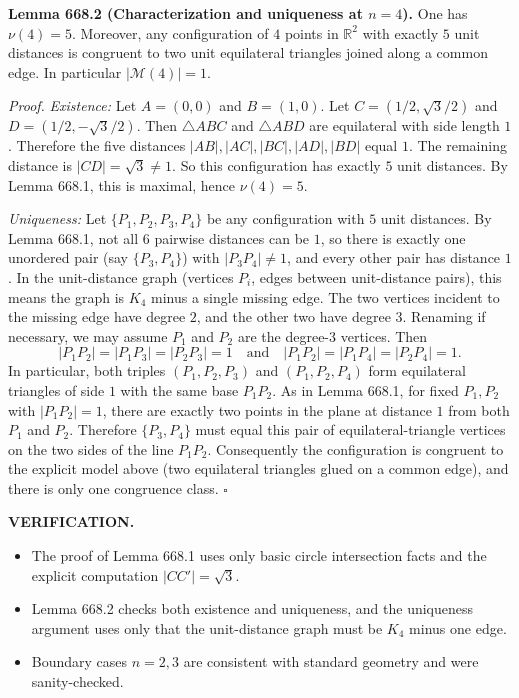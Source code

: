 \medskip
\noindent\textbf{Lemma 668.2 (Characterization and uniqueness at $n=4$).}
One has $\nu(4)=5$.
Moreover, any configuration of $4$ points in $\mathbb{R}^2$ with exactly $5$ unit distances is congruent to two unit equilateral triangles joined along a common edge.
In particular $|\mathcal{M}(4)|=1$.

\noindent\emph{Proof.}
\emph{Existence:} Let $A=(0,0)$ and $B=(1,0)$.
Let $C=(1/2,\sqrt3/2)$ and $D=(1/2,-\sqrt3/2)$.
Then $\triangle ABC$ and $\triangle ABD$ are equilateral with side length $1$.
Therefore the five distances $|AB|,|AC|,|BC|,|AD|,|BD|$ equal $1$.
The remaining distance is $|CD|=\sqrt3\ne 1$.
So this configuration has exactly $5$ unit distances.
By Lemma 668.1, this is maximal, hence $\nu(4)=5$.

\emph{Uniqueness:} Let $\{P_1,P_2,P_3,P_4\}$ be any configuration with $5$ unit distances.
By Lemma 668.1, not all $6$ pairwise distances can be $1$, so there is exactly one unordered pair (say $\{P_3,P_4\}$) with $|P_3P_4|\ne 1$, and every other pair has distance $1$.
In the unit-distance graph (vertices $P_i$, edges between unit-distance pairs), this means the graph is $K_4$ minus a single missing edge.
The two vertices incident to the missing edge have degree $2$, and the other two have degree $3$.
Renaming if necessary, we may assume $P_1$ and $P_2$ are the degree-$3$ vertices.
Then
\[
|P_1P_2|=|P_1P_3|=|P_2P_3|=1
\quad\text{and}\quad
|P_1P_2|=|P_1P_4|=|P_2P_4|=1.
\]
In particular, both triples $(P_1,P_2,P_3)$ and $(P_1,P_2,P_4)$ form equilateral triangles of side $1$ with the same base $P_1P_2$.
As in Lemma 668.1, for fixed $P_1,P_2$ with $|P_1P_2|=1$, there are exactly two points in the plane at distance $1$ from both $P_1$ and $P_2$.
Therefore $\{P_3,P_4\}$ must equal this pair of equilateral-triangle vertices on the two sides of the line $P_1P_2$.
Consequently the configuration is congruent to the explicit model above (two equilateral triangles glued on a common edge), and there is only one congruence class.
\hfill$\square$

\bigskip
\noindent\textbf{VERIFICATION.}
\begin{itemize}
\item The proof of Lemma 668.1 uses only basic circle intersection facts and the explicit computation $|CC'|=\sqrt3$.
\item Lemma 668.2 checks both existence and uniqueness, and the uniqueness argument uses only that the unit-distance graph must be $K_4$ minus one edge.
\item Boundary cases $n=2,3$ are consistent with standard geometry and were sanity-checked.
\end{itemize}

